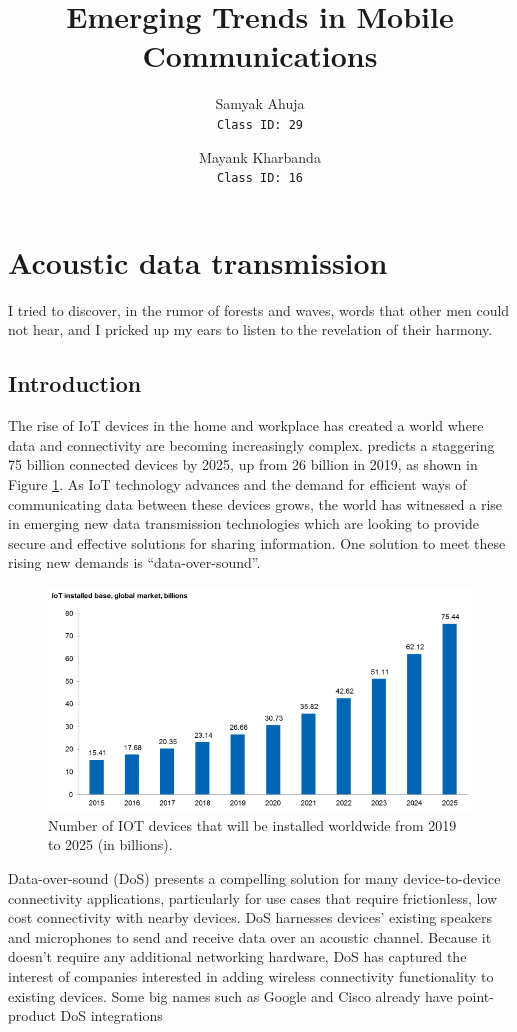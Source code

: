 \documentclass{article}
\title{Emerging Trends in Mobile Communications}
\author{
    Samyak Ahuja \\
    \texttt{Class ID: 29}
    \and
    Mayank Kharbanda \\
    \texttt{Class ID: 16}
}
\begin{document}
\maketitle

\section{Acoustic data transmission}
\epigraph{ I tried to discover, in the rumor of forests and waves, words
that other men could not hear, and I pricked up my ears to listen to the
revelation of their harmony.}{\textcite{november05}}

\subsection{Introduction}
The rise of IoT devices in the home and workplace has created a world where
data and connectivity are becoming increasingly complex. \textcite{ihs16}
predicts a staggering 75 billion connected devices by 2025, up from 26 billion
in 2019, as shown in Figure \ref{fig:ihs_iot}.  As IoT technology advances and the
demand for efficient ways of communicating data between these devices grows,
the world has witnessed a rise in emerging new data transmission technologies
which are looking to provide secure and effective solutions for sharing
information. One solution to meet these rising new demands is “data-over-sound”.

\begin{figure}[!h]
  \includegraphics[width=\linewidth]{res/iot_market_trend.png}
    \caption{Number of IOT devices that will be installed worldwide from 2019
    to 2025 (in billions).}
  \label{fig:ihs_iot}
\end{figure}


Data-over-sound (DoS) presents a compelling solution for many device-to-device
connectivity applications, particularly for use cases that require
frictionless, low cost connectivity with nearby devices. DoS harnesses devices’
existing speakers and microphones to send and receive data over an acoustic
channel. Because it doesn’t require any additional networking hardware, DoS has
captured the interest of companies interested in adding wireless connectivity
functionality to existing devices. Some big names such as Google and Cisco
already have point-product DoS integrations
\end{document}

